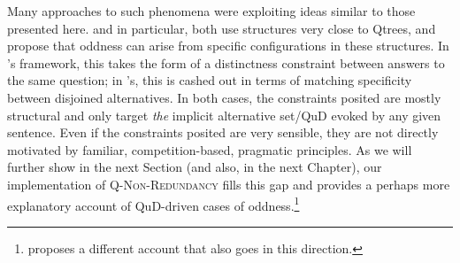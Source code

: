 \begin{exe}
	\begin{xlist}
	\end{xlist}
\end{exe}

Many approaches to such phenomena were exploiting ideas similar to those presented here. \textcite{Ippolito2019} and \textcite{Zhang2022} in particular, both use structures very close to Qtrees, and propose that oddness can arise from specific configurations in these structures. In \citeauthor{Zhang2022}'s framework, this takes the form of a distinctness constraint between answers to the same question; in \citeauthor{Ippolito2019}'s, this is cashed out in terms of matching specificity between disjoined alternatives. In both cases, the constraints posited are mostly structural and only target \textit{the} implicit alternative set/QuD evoked by any given sentence. Even if the constraints posited are very sensible, they are not directly motivated by familiar, competition-based, pragmatic principles. As we will further show in the next Section (and also, in the next Chapter), our implementation of \textsc{Q-Non-Redundancy} fills this gap and provides a perhaps more explanatory account of QuD-driven cases of oddness.\footnote{ proposes a different account that also goes in this direction.}
